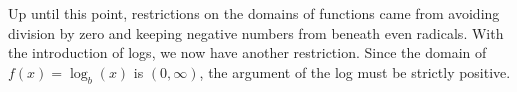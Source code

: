 \pagebreak

Up until this point, restrictions on the domains of functions came from avoiding division by zero and keeping negative numbers from beneath even radicals.  With the introduction of logs, we now have another restriction.  Since the domain of $f(x) = \log_{b}(x)$ is $(0, \infty)$, the argument of the log must be strictly positive.  

\medskip

